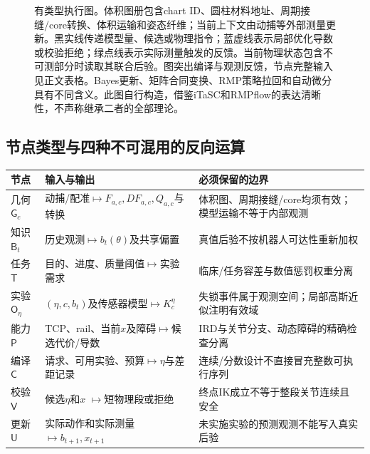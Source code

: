 \documentclass[11pt,a4paper]{article}
\numberwithin{equation}{section}
\theoremstyle{definition}
\begin{document}
\begin{figure}[tbp]
{}
\caption{有类型执行图。体积图册包含chart ID、圆柱材料地址、周期接缝/core转换、体积运输和姿态纤维；当前上下文由动捕等外部测量更新。黑实线传递模型量、候选或物理指令；蓝虚线表示局部优化导数或校验拒绝；绿点线表示实际测量触发的反馈。当前物理状态包含不可测部分时读取其联合后验。图突出编译与观测反馈，节点完整输入见正文表格。Bayes更新、矩阵合同变换、RMP策略拉回和自动微分具有不同含义。此图自行构造，借鉴iTaSC和RMPflow的表达清晰性，不声称继承二者的全部理论。}
\label{graph:fig:architecture}
\end{figure}


\subsection{节点类型与四种不可混用的反向运算}

\begin{center}
\small
\begin{tabular}{p{.14\linewidth}p{.35\linewidth}p{.37\linewidth}}
\hline
节点 & 输入与输出 & 必须保留的边界\\\hline
几何 $\mathsf G_c$ & 动捕/配准$\mapsto F_{a,c},DF_{a,c},Q_{a,c}$与转换 & 体积图、周期接缝/core均须有效；模型运输不等于内部观测\\
知识 $\mathsf B_t$ & 历史观测$\mapsto b_t(\theta)$及共享偏置 & 真值后验不按机器人可达性重新加权\\
任务 $\mathsf T$ & 目的、进度、质量阈值$\mapsto$实验需求 & 临床/任务容差与数值惩罚权重分离\\
实验 $\mathsf O_\eta$ & $(\eta,c,b_t)$及传感器模型$\mapsto K_c^\eta$ & 失锁事件属于观测空间；局部高斯近似注明有效域\\
能力 $\mathsf P$ & TCP、rail、当前$x$及障碍$\mapsto$候选代价/导数 & IRD与关节分支、动态障碍的精确检查分离\\
编译 $\mathsf C$ & 请求、可用实验、预算$\mapsto\eta$与差距记录 & 连续/分数设计不直接冒充整数可执行序列\\
校验 $\mathsf V$ & 候选$\eta$和$x$ $\mapsto$短物理段或拒绝 & 终点IK成立不等于整段关节连续且安全\\
更新 $\mathsf U$ & 实际动作和实际测量$\mapsto b_{t+1},x_{t+1}$ & 未实施实验的预测观测不能写入真实后验\\\hline
\end{tabular}
\end{center}
\end{document}
